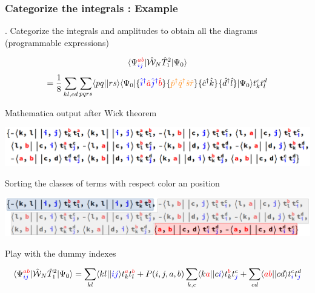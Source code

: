 \documentclass{beamer}
\begin{document}
\begin{frame}
\frametitle{Categorize the integrals : Example}
\begin{footnotesize}
\begin{algorithmic}

. Categorize the integrals and amplitudes to obtain all the diagrams (programmable expressions)


\[
\langle \Psi^{\textcolor{red}{ab}}_{\textcolor{blue}{ij}} |  \hat{\mathcal{W}}_{N} \hat{T}_{1}^{2}   | \Psi_{0} \rangle 
\]
\[
=\frac{1}{8} \sum_{kl,cd}\sum_{pqrs} \langle pq||rs \rangle \langle \Psi_{0} |\{ \textcolor{blue}{\hat{i}^{\dagger}}\textcolor{red}{\hat{a}}\textcolor{blue}{\hat{j}^{\dagger}}\textcolor{red}{\hat{b}} \} \{\textcolor{orange}{\hat{p}^{\dagger}\hat{q}^{\dagger}\hat{s}\hat{r}} \}\{\hat{c}^{\dagger}\hat{k} \} \{ \hat{d}^{\dagger}\hat{l} \}| \Psi_{0} \rangle t_{k}^{c}t_{l}^{d}
\]







\State Mathematica output after Wick theorem

\includegraphics[scale=.2]{sort1}

\State Sorting the classes of terms with respect color an position


\includegraphics[scale=.17]{sort2}

\State  Play with the dummy indexes


\[
\langle \Psi^{\textcolor{red}{ab}}_{\textcolor{blue}{ij}} |  \hat{\mathcal{W}}_{N} \hat{T}_{1}^{2}   | \Psi_{0} \rangle = \sum_{kl} \langle kl||\textcolor{blue}{ij} \rangle  t_{k}^{\textcolor{red}{a}}t_{l}^{\textcolor{red}{b}} +P(i,j,a,b)\sum_{k,c} \langle k \textcolor{red}{a}||c\textcolor{blue}{i} \rangle  
t_{k}^{ \textcolor{red}{b} }t_{ \textcolor{blue}{j}}^{c}+\sum_{cd} \langle  \textcolor{red}{ab}||cd \rangle  
t_{\textcolor{blue}{i}}^{ c }t_{ \textcolor{blue}{j}}^{d}
\]







\end{algorithmic}


\end{footnotesize}

\end{frame}
\end{document}
